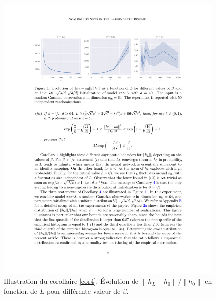 \begin{figure}[H]
    \centering
    \includegraphics[width=.95\textwidth]{figs/figure_cor4.pdf}
    \caption{Illustration du corollaire \ref{cor4}. Évolution de $ \left\| h_L - h_0 \right\| / \left\| h_0 \right\| $ en fonction de $ L $ pour différente valeur de $ \beta  $.}
    \label{fig:cor4}
\end{figure}

